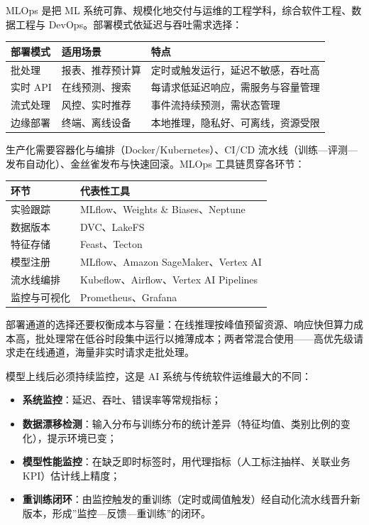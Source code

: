 \documentclass[
]{ctexbook}
\providecommand{\tightlist}{\setlength{\itemsep}{0pt}\setlength{\parskip}{0pt} }
\newcounter{none}
\begin{document}
MLOps 是把 ML
系统可靠、规模化地交付与运维的工程学科，综合软件工程、数据工程与
DevOps。部署模式依延迟与吞吐需求选择：

{\def\LTcaptype{none} %
\begin{longtable}[]{@{}lll@{}}
\toprule\noalign{}
部署模式 & 适用场景 & 特点 \\
\midrule\noalign{}
\endhead
\bottomrule\noalign{}
\endlastfoot
批处理 & 报表、推荐预计算 & 定时或触发运行，延迟不敏感，吞吐高 \\
实时 API & 在线预测、搜索 & 每请求低延迟响应，需服务与容量管理 \\
流式处理 & 风控、实时推荐 & 事件流持续预测，需状态管理 \\
边缘部署 & 终端、离线设备 & 本地推理，隐私好、可离线，资源受限 \\
\end{longtable}
}

生产化需要容器化与编排（Docker/Kubernetes）、CI/CD
流水线（训练---评测---发布自动化）、金丝雀发布与快速回滚。MLOps
工具链贯穿各环节：

{\def\LTcaptype{none} %
\begin{longtable}[]{@{}ll@{}}
\toprule\noalign{}
环节 & 代表性工具 \\
\midrule\noalign{}
\endhead
\bottomrule\noalign{}
\endlastfoot
实验跟踪 & MLflow、Weights \& Biases、Neptune \\
数据版本 & DVC、LakeFS \\
特征存储 & Feast、Tecton \\
模型注册 & MLflow、Amazon SageMaker、Vertex AI \\
流水线编排 & Kubeflow、Airflow、Vertex AI Pipelines \\
监控与可视化 & Prometheus、Grafana \\
\end{longtable}
}

部署通道的选择还要权衡成本与容量：在线推理按峰值预留资源、响应快但算力成本高，批处理常在低谷时段集中运行以摊薄成本；两者常混合使用------高优先级请求走在线通道，海量非实时请求走批处理。

模型上线后必须持续监控，这是 AI 系统与传统软件运维最大的不同：

\begin{itemize}
\tightlist
\item
  \textbf{系统监控}：延迟、吞吐、错误率等常规指标；
\item
  \textbf{数据漂移检测}：输入分布与训练分布的统计差异（特征均值、类别比例的变化），提示环境已变；
\item
  \textbf{模型性能监控}：在缺乏即时标签时，用代理指标（人工标注抽样、关联业务
  KPI）估计线上精度；
\item
  \textbf{重训练闭环}：由监控触发的重训练（定时或阈值触发）经自动化流水线晋升新版本，形成''监控---反馈---重训练''的闭环。
\end{itemize}
\end{document}

